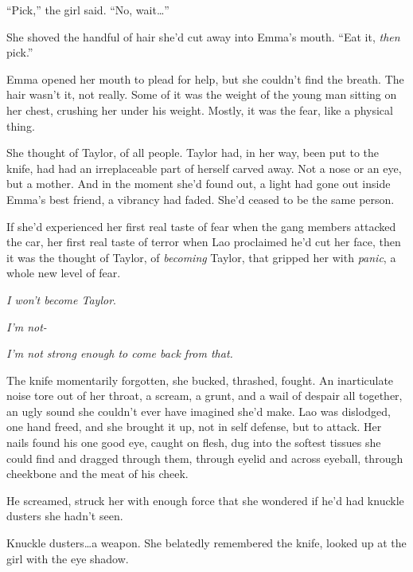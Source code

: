``Pick,'' the girl said.  ``No, wait\ldots''



She shoved the handful of hair she'd cut away into Emma's mouth.  ``Eat it, \emph{then} pick.''



Emma opened her mouth to plead for help, but she couldn't find the breath.  The hair wasn't it, not really.  Some of it was the weight of the young man sitting on her chest, crushing her under his weight.  Mostly, it was the fear, like a physical thing.



She thought of Taylor, of all people.  Taylor had, in her way, been put to the knife, had had an irreplaceable part of herself carved away.  Not a nose or an eye, but a mother.  And in the moment she'd found out, a light had gone out inside Emma's best friend, a vibrancy had faded.  She'd ceased to be the same person.



If she'd experienced her first real taste of fear when the gang members attacked the car, her first real taste of terror when Lao proclaimed he'd cut her face, then it was the thought of Taylor, of \emph{becoming} Taylor, that gripped her with \emph{panic}, a whole new level of fear.



\emph{I won't become Taylor}.



\emph{I'm not-}



\emph{I'm not strong enough to come back from that.}



The knife momentarily forgotten, she bucked, thrashed, fought.  An inarticulate noise tore out of her throat, a scream, a grunt, and a wail of despair all together, an ugly sound she couldn't ever have imagined she'd make.  Lao was dislodged, one hand freed, and she brought it up, not in self defense, but to attack.  Her nails found his one good eye, caught on flesh, dug into the softest tissues she could find and dragged through them, through eyelid and across eyeball, through cheekbone and the meat of his cheek.



He screamed, struck her with enough force that she wondered if he'd had knuckle dusters she hadn't seen.



Knuckle dusters\ldots a weapon.  She belatedly remembered the knife, looked up at the girl with the eye shadow.



